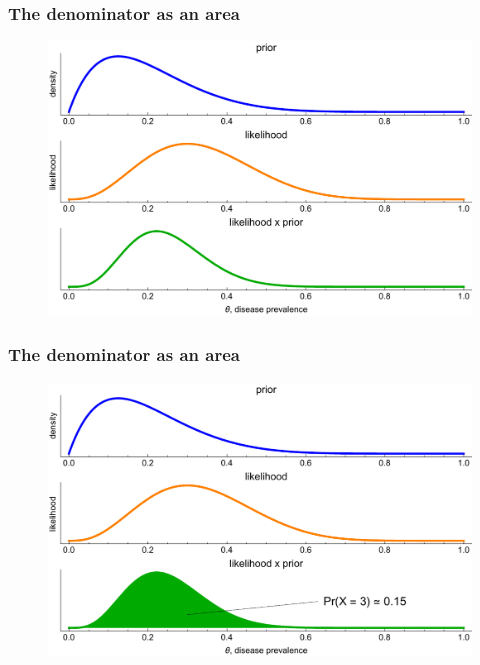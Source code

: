 \documentclass[handout]{beamer}
\begin{document}
\begin{frame}
	\frametitle{The denominator as an area}
	
	\begin{figure}
		\centerline{\includegraphics[width=1\textwidth]{figures/binomial_area_1.pdf}}
	\end{figure}
	
\end{frame}

\begin{frame}
	\frametitle{The denominator as an area}
	
	\begin{figure}
		\centerline{\includegraphics[width=1\textwidth]{figures/binomial_area_2.pdf}}
	\end{figure}
	
\end{frame}
\end{document}
